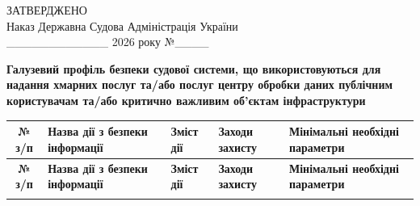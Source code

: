 \documentclass[10pt]{article}
\begin{document}
\begin{flushright}
ЗАТВЕРДЖЕНО\\
Наказ Державна Судова Адміністрація України\\
\_\_\_\_\_\_\_\_\_\_\_\_ 2026 року №\_\_\_\_
\end{flushright}

\begin{center}
\textbf{\large Галузевий профіль безпеки судової системи, що використовуються для надання хмарних послуг та/або послуг центру обробки даних публічним користувачам та/або критично важливим об’єктам інфраструктури}
\end{center}

\footnotesize
\begin{longtable}{|c|>{\raggedright\arraybackslash}p{4cm}|>{\raggedright\arraybackslash}p{6cm}|>{\raggedright\arraybackslash}p{1.5cm}|>{\raggedright\arraybackslash}p{3.5cm}|}
\hline
\textbf{№ з/п} & \textbf{Назва дії з безпеки інформації} & \textbf{Зміст дії} & \textbf{Заходи захисту} & \textbf{Мінімальні необхідні параметри}\\
\hline
\endfirsthead

\hline
\textbf{№ з/п} & \textbf{Назва дії з безпеки інформації} & \textbf{Зміст дії} & \textbf{Заходи захисту} & \textbf{Мінімальні необхідні параметри}\\
\hline
\endhead

\hline
\endfoot

\hline
\endlastfoot


\end{longtable}
\end{document}
